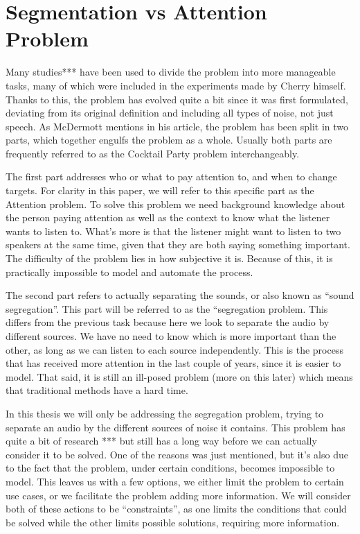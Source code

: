 \documentclass{book}
\begin{document}
\section{Segmentation vs Attention Problem}
\qquad Many studies*** have been used to divide the problem into more manageable tasks, many of which were included in the experiments made by Cherry himself. Thanks to this, the problem has evolved quite a bit since it was first formulated, deviating from its original definition and including all types of noise, not just speech. As McDermott mentions in his article\cite{CocktailPartyProblemRevisit}, the problem has been split in two parts, which together engulfs the problem as a whole. Usually both parts are frequently referred to as the Cocktail Party problem interchangeably.
\par
The first part addresses who or what to pay attention to, and when to change targets. For clarity in this paper, we will refer to this specific part as the Attention problem. To solve this problem we need background knowledge about the person paying attention as well as the context to know what the listener wants to listen to. What's more is that the listener might want to listen to two speakers at the same time, given that they are both saying something important. The difficulty of the problem lies in how subjective it is. Because of this, it is practically impossible to model and automate the process.
\par
The second part refers to actually separating the sounds, or also known as “sound segregation”. This part will be referred to as the “segregation problem. This differs from the previous task because here we look to separate the audio by different sources. We have no need to know which is more important than the other, as long as we can listen to each source independently. This is the process that has received more attention in the last couple of years, since it is easier to model. That said, it is still an ill-posed problem (more on this later) which means that traditional methods have a hard time.
\par
In this thesis we will only be addressing the segregation problem, trying to separate an audio by the different sources of noise it contains. This problem has quite a bit of research *** but still has a long way before we can actually consider it to be solved. One of the reasons was just mentioned, but it’s also due to the fact that the problem, under certain conditions, becomes impossible to model. This leaves us with a few options, we either limit the problem to certain use cases, or we facilitate the problem adding more information. We will consider both of these actions to be “constraints”, as one limits the conditions that could be solved while the other limits possible solutions, requiring more information.
\end{document}
